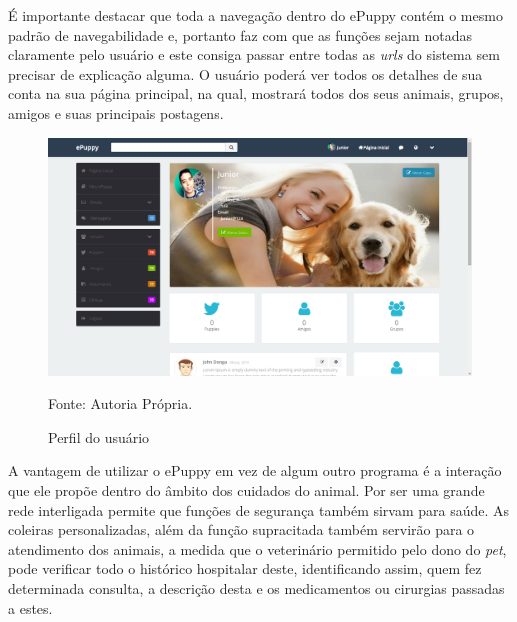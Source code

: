 \newpage

É importante destacar que toda a navegação dentro do ePuppy contém o mesmo padrão de navegabilidade e, portanto faz com que as funções sejam notadas claramente pelo usuário e este consiga passar entre todas as {\it urls} do sistema sem precisar de explicação alguma. O usuário poderá ver todos os detalhes de sua conta na sua página principal, na qual, mostrará todos dos seus animais, grupos, amigos e suas principais postagens.

\begin{figure}[h!]
	\center	\includegraphics[scale=0.25
	]{imagens/perfil}
	\caption{Perfil do usuário}
	Fonte: Autoria Própria.
	\label{Rotulo}
\end{figure}


A vantagem de utilizar o ePuppy em vez de algum outro programa é a interação que ele propõe dentro do âmbito dos cuidados do animal. Por ser uma grande rede interligada permite que funções de segurança também sirvam para saúde. As coleiras personalizadas, além da função supracitada também servirão para o atendimento dos animais, a medida que o veterinário permitido pelo dono do {\it pet}, pode verificar todo o histórico hospitalar deste, identificando assim, quem fez determinada consulta, a descrição desta e os medicamentos ou cirurgias passadas a estes.


